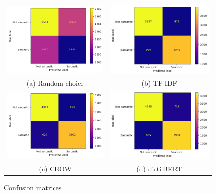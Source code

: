 \begin{figure}[h]
	\begin{tabular}{cc}
		\includegraphics[width=70mm]{../img/dummy-cm.png}\label{cmrandom} &   \includegraphics[width=70mm]{../img/tfidf-cm.png}\label{cmtfidf} \\
		(a) Random choice & (b) TF-IDF \\[6pt]
		\includegraphics[width=70mm]{../img/w2v-cm.png}\label{cmcbow} &   \includegraphics[width=70mm]{../img/bert-cm.png}\label{cmdistilbert} \\
		(c) CBOW & (d) distilBERT \\[6pt]
	\end{tabular}
	
	\caption{Confusion matrices}
	\label{cm}
\end{figure}
